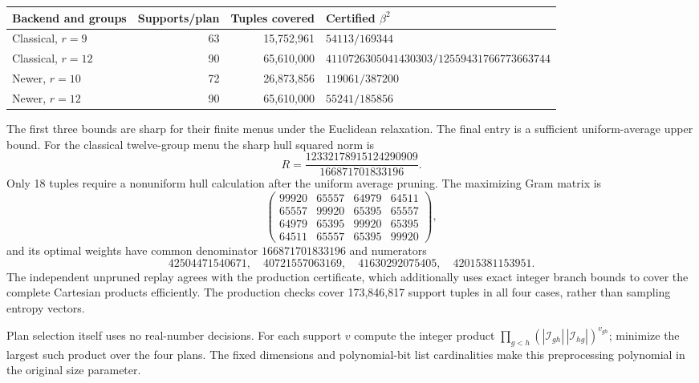 \begin{center}\small
\begin{tabular}{lrrl}
\toprule
Backend and groups & Supports/plan & Tuples covered & Certified $\beta^2$\\
\midrule
Classical, $r=9$ &63&15,752,961&$54113/169344$\\
Classical, $r=12$ &90&65,610,000&
$4110726305041430303/12559431766773663744$\\
Newer, $r=10$ &72&26,873,856&$119061/387200$\\
Newer, $r=12$ &90&65,610,000&$55241/185856$\\
\bottomrule
\end{tabular}
\end{center}
The first three bounds are sharp for their finite menus under the Euclidean
relaxation. The final entry is a sufficient uniform-average upper bound.
For the classical twelve-group menu the sharp hull squared norm is
\[
 R=\frac{12332178915124290909}{166871701833196}.
\]
Only 18 tuples require a nonuniform hull calculation after the uniform
average pruning. The maximizing Gram matrix is
\[
\begin{pmatrix}
99920&65557&64979&64511\\
65557&99920&65395&65557\\
64979&65395&99920&65395\\
64511&65557&65395&99920
\end{pmatrix},
\]
and its optimal weights have common denominator $166871701833196$ and
numerators
\[
42504471540671,\quad40721557063169,\quad
41630292075405,\quad42015381153951.
\]
The independent unpruned replay agrees with the production certificate,
which additionally uses exact integer branch bounds to cover the complete
Cartesian products efficiently. The production checks cover 173,846,817
support tuples in all four cases, rather than sampling entropy vectors.

Plan selection itself uses no real-number decisions. For each support $v$
compute the integer product
$\prod_{g<h}(|\mathcal I_{gh}|\,|\mathcal I_{hg}|)^{v_{gh}}$;
minimize the largest such product over the four plans. The fixed dimensions
and polynomial-bit list cardinalities make this preprocessing polynomial
in the original size parameter.

